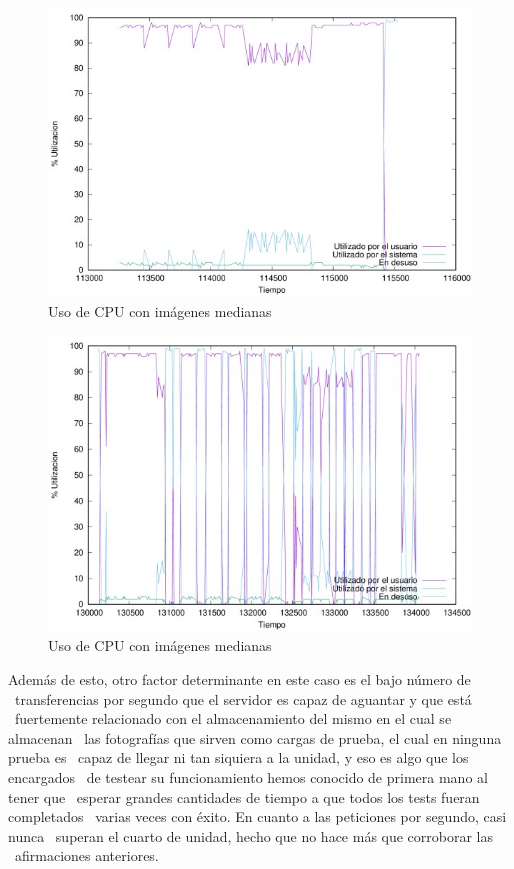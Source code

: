 \documentclass[11pt,twoside,a4paper]{book}
\begin{document}
\begin{figure}[H]
   \includegraphics[width=\textwidth]{cpumedianos.jpg}
   \caption{Uso de CPU con imágenes medianas}
   \label{cpu2}
\end{figure}

\begin{figure}[H]
   \includegraphics[width=\textwidth]{cpupequenos.jpg}
   \caption{Uso de CPU con imágenes medianas}
   \label{cpu3}
\end{figure}

Además de esto, otro factor determinante en este caso es el bajo número de \
transferencias por segundo que el servidor es capaz de aguantar y que está \
fuertemente relacionado con el almacenamiento del mismo en el cual se almacenan \
las fotografías que sirven como cargas de prueba, el cual en ninguna prueba es \
capaz de llegar ni tan siquiera a la unidad, y eso es algo que los encargados \
de testear su funcionamiento hemos conocido de primera mano al tener que \
esperar grandes cantidades de tiempo a que todos los tests fueran completados \
varias veces con éxito. En cuanto a las peticiones por segundo, casi nunca \
superan el cuarto de unidad, hecho que no hace más que corroborar las \
afirmaciones anteriores. \newline
\end{document}
